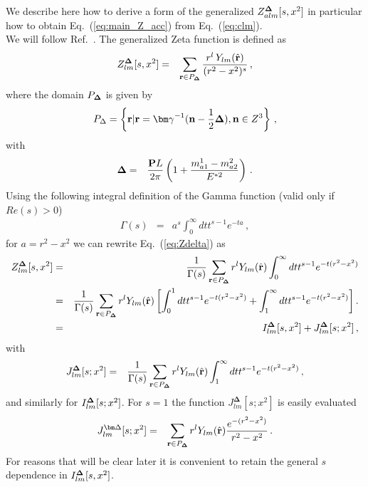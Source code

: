 
	\noindent
	We describe here how to derive a form of the generalized $Z^{\bf\Delta}_{alm}[s,x^2]$ in particular how to obtain Eq.~(\ref{eq:main_Z_acc}) from Eq.~(\ref{eq:clm}).\\
	We will follow Ref.~\cite{Leskovec:2012gb}.
	The generalized Zeta function is defined as
	\begin{eqnarray}
	Z^{\bf\Delta}_{lm}[s,x^2]&=&\sum_{{\bf r}\in P_{\bf \Delta}}\frac{r^l\,Y_{lm}(\hat {\bf r})}{(r^2-x^2)^s}\, ,\label{eq:Zdelta}
	\end{eqnarray}
	where the domain $P_{\bf \Delta}$ is given by
	\begin{eqnarray}
	P_{\Delta}= \left\{{\bf r}|{\bf r}={\bm \gamma}^{-1}({\bf n}-\frac{1}{2}{\bf \Delta}),{\bf n}\in Z^{3}\right\}\, \label{eq:Pd},
	\end{eqnarray}
	with
	\begin{eqnarray}
	{\bf \Delta}&=&\frac{{\bf P}L}{2\pi}\left(1+\frac{m_{a1}^1-m_{a2}^2}{E^{*2}}\right)\, .
	\end{eqnarray}
	Using the following integral definition of the Gamma function (valid only if $Re(s)>0$)
	\begin{eqnarray}
	\Gamma(s)&=&a^s\int_0^\infty dt t^{s-1}e^{-ta}\, ,
	\end{eqnarray}
	for $a=r^2-x^2$ we can rewrite Eq.~(\ref{eq:Zdelta}) as
	\begin{eqnarray}
	Z_{lm}^{\bf \Delta}[s,x^2]&=&\frac{1}{\Gamma(s)}\sum_{{\bf r}\in P_{\bf \Delta}}r^lY_{lm}(\hat{{\bf r}})\int_0^\infty dt t^{s-1}e^{-t(r^2-x^2)}\\
	&=&\frac{1}{\Gamma(s)}\sum_{{\bf r}\in P_{\bf \Delta}}r^lY_{lm}(\hat{{\bf r}})
	\left[\int_0^1 dt t^{s-1}e^{-t(r^2-x^2)}+\int_1^\infty dt t^{s-1}e^{-t(r^2-x^2)}\right]\label{eq:Zexp}.\nonumber\\
	&=&I^{\bf\Delta}_{lm}[s,x^2]+J^{\bf\Delta}_{lm}[s;x^2]\, ,
	\end{eqnarray}
	with
	\begin{eqnarray}
	J^{\bf \Delta}_{lm}[s;x^2]&=&\frac{1}{\Gamma(s)}\sum_{{\bf r}\in P_{\bf \Delta}}r^lY_{lm}(\hat{{\bf r}})\int_1^\infty dt t^{s-1}e^{-t(r^2-x^2)}\, ,
	\end{eqnarray}
	and similarly for $I^{\bf\Delta}_{lm}[s;x^2]$.
	For $s=1$ the function $J^{\bm\Delta}_{lm}[s;x^2]$ is easily evaluated
	\begin{eqnarray}
	J^{\bm\Delta}_{lm}[s;x^2]&=&\sum_{{\bf r}\in P_{\bf \Delta}}r^lY_{lm}(\hat{{\bf r}})\frac{e^{-(r^2-x^2)}}{r^2-x^2}\, .
	\end{eqnarray}
	For reasons that will be clear later it is convenient to retain the general $s$ dependence in $I^{\bf\Delta}_{lm}[s,x^2]$.
